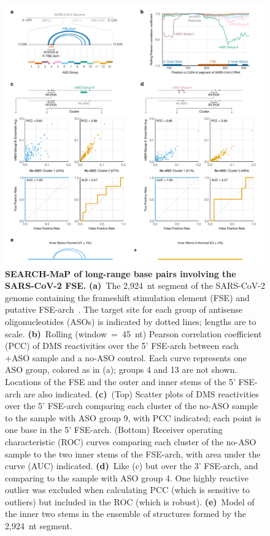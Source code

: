 \documentclass[main.tex]{subfiles}
\begin{document}
\begin{figure}[H]
	\includegraphics[width=\textwidth]{../MainFigures/sars2-tile/sars2-tile.pdf}
	\caption{\textbf{SEARCH-MaP of long-range base pairs involving the SARS-CoV-2 FSE.} \textbf{(a)}~The 2,924~nt segment of the SARS-CoV-2 genome containing the frameshift stimulation element (FSE) and putative FSE-arch~\cite{Ziv2020}. The target site for each group of antisense oligonucleotides (ASOs) is indicated by dotted lines; lengths are to scale. \textbf{(b)}~Rolling (window~=~45~nt) Pearson correlation coefficient (PCC) of DMS reactivities over the 5' FSE-arch between each +ASO sample and a no-ASO control. Each curve represents one ASO group, colored as in (a); groups 4 and 13 are not shown. Locations of the FSE and the outer and inner stems of the 5' FSE-arch are also indicated. \textbf{(c)}~(Top) Scatter plots of DMS reactivities over the 5' FSE-arch comparing each cluster of the no-ASO sample to the sample with ASO group 9, with PCC indicated; each point is one base in the 5' FSE-arch. (Bottom) Receiver operating characteristic (ROC) curves comparing each cluster of the no-ASO sample to the two inner stems of the FSE-arch, with area under the curve (AUC) indicated. \textbf{(d)}~Like (c) but over the 3' FSE-arch, and comparing to the sample with ASO group 4. One highly reactive outlier was excluded when calculating PCC (which is sensitive to outliers) but included in the ROC (which is robust). \textbf{(e)}~Model of the inner two stems in the ensemble of structures formed by the 2,924~nt segment.}
	\label{tiles}
\end{figure}
\end{document}
